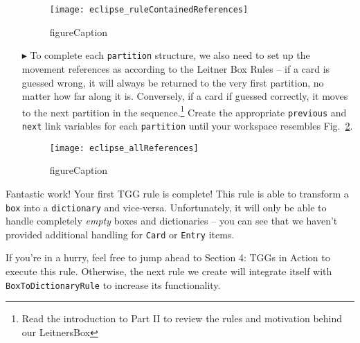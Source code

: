 \begin{itemize}
\begin{figure}[htbp]
\begin{center}
  \texttt{[image: eclipse\_ruleContainedReferences]}
  \caption{figureCaption}
  \label{fig:firstReferences}
\end{center}
\end{figure}

\item[$\blacktriangleright$] To complete each \texttt{partition} structure, we also need to set up the movement references as according to the Leitner Box
Rules -- if a card is guessed wrong, it will always be returned to the very first partition, no matter how far along it is. Conversely, if a card if guessed
correctly, it moves to the next partition in the sequence.\footnote{Read the introduction to Part II to review the rules and motivation behind our LeitnersBox}
Create the appropriate \texttt{previous} and \texttt{next} link variables for each \texttt{partition} until your workspace resembles
Fig.~\ref{fig:allReferences}.

\begin{figure}[htbp]
\begin{center}
  \texttt{[image: eclipse\_allReferences]}
  \caption{figureCaption}
  \label{fig:allReferences}
\end{center}
\end{figure}

\end{itemize}

Fantastic work! Your first TGG rule is complete! This rule is able to transform a \texttt{box} into a \texttt{dictionary} and vice-versa. Unfortunately, it will
only be able to handle completely \emph{empty} boxes and dictionaries -- you can see that we haven't provided additional handling for \texttt{Card} or
\texttt{Entry} items.

If you're in a hurry, feel free to jump ahead to Section 4: TGGs in Action to execute this rule. Otherwise, the next rule we create will integrate itself with
\texttt{BoxToDictionaryRule} to increase its functionality. 


